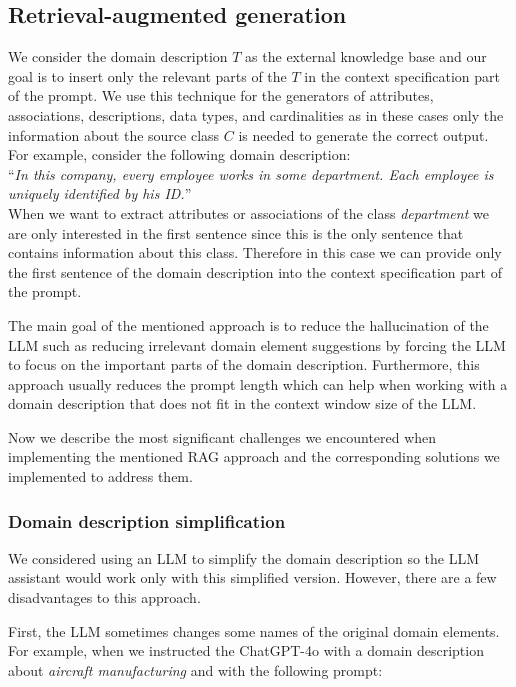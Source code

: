 \subsection{Retrieval-augmented generation}

We consider the domain description $T$ as the external knowledge base and our goal is to insert only the relevant parts of the $T$ in the context specification part of the prompt. We use this technique for the generators of attributes, associations, descriptions, data types, and cardinalities as in these cases only the information about the source class $C$ is needed to generate the correct output. For example, consider the following domain description: \\

\noindent{}``\textit{In this company, every employee works in some department. Each employee is uniquely identified by his ID.}''\\

\noindent{}When we want to extract attributes or associations of the class \textit{department} we are only interested in the first sentence since this is the only sentence that contains information about this class. Therefore in this case we can provide only the first sentence of the domain description into the context specification part of the prompt.

The main goal of the mentioned approach is to reduce the hallucination of the LLM such as reducing irrelevant domain element suggestions by forcing the LLM to focus on the important parts of the domain description. Furthermore, this approach usually reduces the prompt length which can help when working with a domain description that does not fit in the context window size of the LLM.

Now we describe the most significant challenges we encountered when implementing the mentioned RAG approach and the corresponding solutions we implemented to address them.


\subsubsection{Domain description simplification}

We considered using an LLM to simplify the domain description so the LLM assistant would work only with this simplified version. However, there are a few disadvantages to this approach.

First, the LLM sometimes changes some names of the original domain elements. For example, when we instructed the ChatGPT-4o with a domain description about \textit{aircraft manufacturing} and with the following prompt: \\

